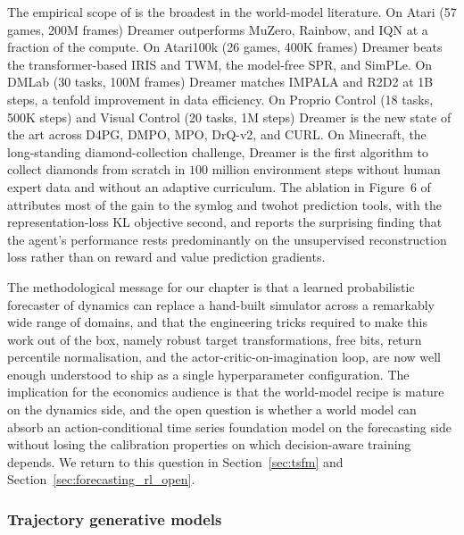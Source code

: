 The empirical scope of \citet{Hafner2025} is the broadest in the world-model
literature. On Atari (57 games, 200M frames) Dreamer outperforms MuZero, Rainbow,
and IQN at a fraction of the compute. On Atari100k (26 games, 400K frames)
Dreamer beats the transformer-based IRIS and TWM, the model-free SPR, and SimPLe.
On DMLab (30 tasks, 100M frames) Dreamer matches IMPALA and R2D2 at 1B steps,
a tenfold improvement in data efficiency. On Proprio Control (18 tasks, 500K
steps) and Visual Control (20 tasks, 1M steps) Dreamer is the new state of the
art across D4PG, DMPO, MPO, DrQ-v2, and CURL. On Minecraft, the long-standing
diamond-collection challenge, Dreamer is the first algorithm to collect diamonds
from scratch in $100$ million environment steps without human expert data and
without an adaptive curriculum. The ablation in Figure~6 of \citet{Hafner2025}
attributes most of the gain to the symlog and twohot prediction tools, with the
representation-loss KL objective second, and reports the surprising finding that
the agent's performance rests predominantly on the unsupervised reconstruction
loss rather than on reward and value prediction gradients.

The methodological message for our chapter is that a learned probabilistic
forecaster of dynamics can replace a hand-built simulator across a remarkably
wide range of domains, and that the engineering tricks required to make this work
out of the box, namely robust target transformations, free bits, return
percentile normalisation, and the actor-critic-on-imagination loop, are now
well enough understood to ship as a single hyperparameter configuration. The
implication for the economics audience is that the world-model recipe is
mature on the dynamics side, and the open question is whether a world model can
absorb an action-conditional time series foundation model on the forecasting
side without losing the calibration properties on which decision-aware training
depends. We return to this question in Section~\ref{sec:tsfm} and
Section~\ref{sec:forecasting_rl_open}.

\subsubsection{Trajectory generative models}
\label{sec:trajectory_models}

